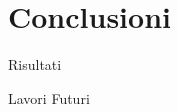 
\section{Conclusioni}

\begin{frame}{Risultati}
    
\end{frame}

\begin{frame}{Lavori Futuri}
    
\end{frame}